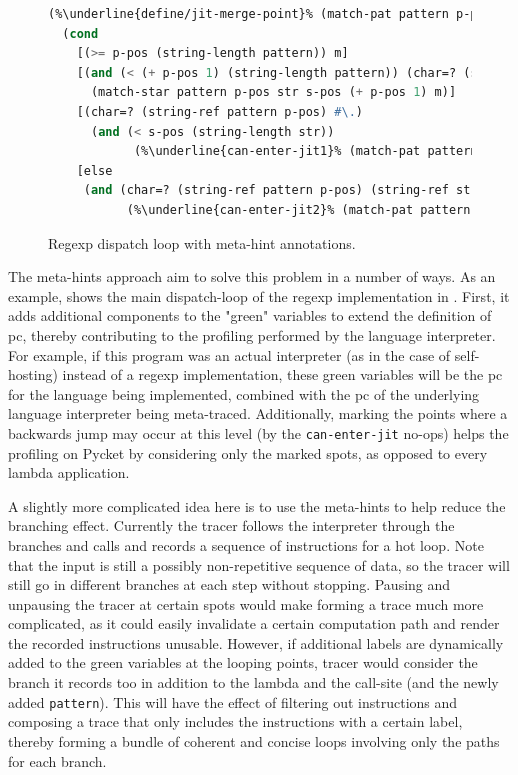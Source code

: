 \begin{figure}[h!]
  \footnotesize
  \begin{mdframed}
\begin{lstlisting}[mathescape,escapechar=\%,language=lisp]
(%\underline{define/jit-merge-point}% (match-pat pattern p-pos str s-pos m) %\underline{\#:greens pattern}%
  (cond
    [(>= p-pos (string-length pattern)) m]
    [(and (< (+ p-pos 1) (string-length pattern)) (char=? (string-ref pattern (+ p-pos 1)) #\*))
      (match-star pattern p-pos str s-pos (+ p-pos 1) m)]
    [(char=? (string-ref pattern p-pos) #\.)
      (and (< s-pos (string-length str))
            (%\underline{can-enter-jit1}% (match-pat pattern (add1 p-pos) str (add1 s-pos) (cons (string-ref str s-pos) m))))]
    [else
     (and (char=? (string-ref pattern p-pos) (string-ref str s-pos))
           (%\underline{can-enter-jit2}% (match-pat pattern (add1 p-pos) str (add1 s-pos) (cons (string-ref str s-pos) m))))]))
\end{lstlisting}
\end{mdframed}
\caption{Regexp dispatch loop with meta-hint annotations.}
\label{fig:annotated-regexp}
\vspace{-0.25cm}
\end{figure}

The meta-hints approach aim to solve this problem in a number of
ways. As an example,  shows the main
dispatch-loop of the regexp implementation in
. First, it adds additional components to the
"green" variables to extend the definition of pc, thereby contributing
to the profiling performed by the language interpreter. For example,
if this program was an actual interpreter (as in the case of
self-hosting) instead of a regexp implementation, these green
variables will be the pc for the language being implemented, combined
with the pc of the underlying language interpreter being
meta-traced. Additionally, marking the points where a backwards jump
may occur at this level (by the \verb|can-enter-jit| no-ops) helps the
profiling on Pycket by considering only the marked spots, as opposed
to every lambda application.

A slightly more complicated idea here is to use the meta-hints to help
reduce the branching effect. Currently the tracer follows the
interpreter through the branches and calls and records a sequence of
instructions for a hot loop. Note that the input is still a possibly
non-repetitive sequence of data, so the tracer will still go in
different branches at each step without stopping. Pausing and
unpausing the tracer at certain spots would make forming a trace much
more complicated, as it could easily invalidate a certain computation
path and render the recorded instructions unusable. However, if
additional labels are dynamically added to the green variables at the
looping points, tracer would consider the branch it records too in
addition to the lambda and the call-site (and the newly added
\verb|pattern|). This will have the effect of filtering out
instructions and composing a trace that only includes the instructions
with a certain label, thereby forming a bundle of coherent and concise
loops involving only the paths for each branch.

